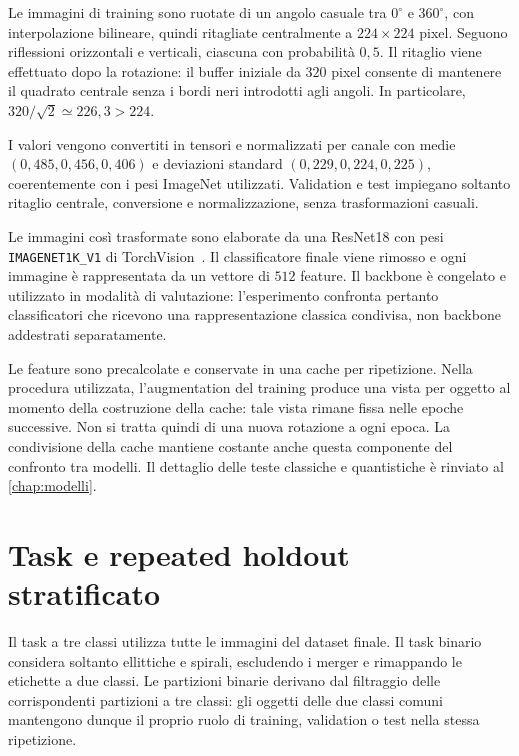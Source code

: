Le immagini di training sono ruotate di un angolo casuale tra
\(0^\circ\) e \(360^\circ\), con interpolazione bilineare, quindi
ritagliate centralmente a \(224\times224\) pixel. Seguono riflessioni
orizzontali e verticali, ciascuna con probabilità \(0{,}5\).
Il ritaglio viene effettuato dopo la rotazione: il buffer iniziale
da \(320\) pixel consente di mantenere il quadrato centrale senza i bordi
neri introdotti agli angoli. In particolare,
\(320/\sqrt{2}\simeq226{,}3>224\).

I valori vengono convertiti in tensori e normalizzati per canale con
medie \((0{,}485,0{,}456,0{,}406)\) e deviazioni standard
\((0{,}229,0{,}224,0{,}225)\), coerentemente con i pesi ImageNet
utilizzati. Validation e test impiegano soltanto ritaglio centrale,
conversione e normalizzazione, senza trasformazioni casuali.

Le immagini così trasformate sono elaborate da una ResNet18
\cite{he2016resnet} con pesi \texttt{IMAGENET1K\_V1} di
TorchVision~\cite{torchvisionresnet18}. Il classificatore finale viene
rimosso e ogni immagine è rappresentata da un vettore di \(512\) feature.
Il backbone è congelato e utilizzato in modalità di valutazione:
l'esperimento confronta pertanto classificatori che ricevono una
rappresentazione classica condivisa, non backbone addestrati separatamente.

Le feature sono precalcolate e conservate in una cache per ripetizione.
Nella procedura utilizzata, l'augmentation del training produce una
vista per oggetto al momento della costruzione della cache: tale vista
rimane fissa nelle epoche successive. Non si tratta quindi di una nuova
rotazione a ogni epoca. La condivisione della cache mantiene costante
anche questa componente del confronto tra modelli. Il dettaglio delle
teste classiche e quantistiche è rinviato al \cref{chap:modelli}.

\section{Task e repeated holdout stratificato}
\label{sec:holdout}

Il task a tre classi utilizza tutte le immagini del dataset finale.
Il task binario considera soltanto ellittiche e spirali, escludendo
i merger e rimappando le etichette a due classi. Le partizioni binarie
derivano dal filtraggio delle corrispondenti partizioni a tre classi:
gli oggetti delle due classi comuni mantengono dunque il proprio ruolo
di training, validation o test nella stessa ripetizione.

